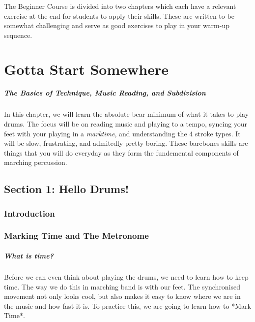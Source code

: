 \documentclass[12pt,letterpaper]{book}
\begin{document}
The Beginner Course is divided into two chapters which each have a relevant exercise at the end for students to apply their skills.  These are written to be somewhat challenging and serve as good exercises to play in your warm-up sequence.


\chapter{Gotta Start Somewhere}

\paragraph{The Basics of Technique, Music Reading, and Subdivision}

In this chapter, we will learn the absolute bear minimum of what it takes to play drums.  The focus will be on reading music and playing to a tempo, syncing your feet with your playing in a \textit{marktime}, and understanding the 4 stroke types.  It will be slow, frustrating, and admitedly pretty boring.  These barebones skills are things that you will do everyday as they form the fundemental components of marching percussion.

\section{Section 1: Hello Drums!}

\subsection{Introduction}


\subsection{Marking Time and The Metronome}

\paragraph{What is time?} 

Before we can even think about playing the drums, we need to learn how to keep time. The way we do this in marching band is with our feet.  The synchronised movement not only looks cool, but also makes it easy to know where we are in the music and how fast it is.  To practice this, we are going to learn how to *Mark Time*.
\end{document}
